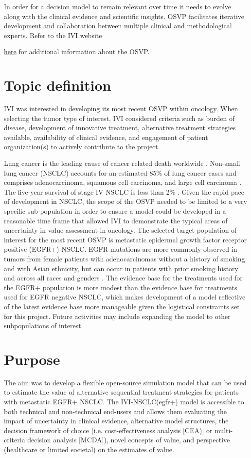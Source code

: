 \documentclass[11pt,final,fleqn]{article}\usepackage[]{graphicx}\usepackage[]{color}
\theoremstyle{plain}
\begin{document}
In order for a decision model to remain relevant over time it needs to evolve along with the clinical evidence and scientific insights. OSVP facilitates iterative development and collaboration between multiple clinical and methodological experts.
Refer to the IVI website {\href{https://www.thevalueinitiative.org/open-source-value-project/}{here} for additional information about the OSVP. 


\section{Topic definition}\label{sec:topic}
IVI was interested in developing its most recent OSVP within oncology. When selecting the tumor type of interest, IVI considered criteria such as burden of disease, development of innovative treatment, alternative treatment strategies available, availability of clinical evidence, and engagement of patient organization(s) to actively contribute to the project. 

Lung cancer is the leading cause of cancer related death worldwide \citep{jemal2011global}. Non-small lung cancer (NSCLC) accounts for an estimated 85\% of lung cancer cases and comprises adenocarcinoma, squamous cell carcinoma, and large cell carcinoma \citep{d2010metastatic}. The five-year survival of stage IV NSCLC is less than 2\% \citep{cetin2011survival}. Given the rapid pace of development in NSCLC, the scope of the OSVP needed to be limited to a very specific sub-population in order to ensure a model could be developed in a reasonable time frame that allowed IVI to demonstrate the typical areas of uncertainty in value assessment in oncology. The selected target population of interest for the most recent OSVP is metastatic epidermal growth factor receptor positive (EGFR+) NSCLC. EGFR mutations are more commonly observed in tumors from female patients with adenocarcinomas without a history of smoking and with Asian ethnicity, but can occur in patients with prior smoking history and across all races and genders \citep{lynch2004activating}. The evidence base for the treatments used for the EGFR+ population is more modest than the evidence base for treatments used for EGFR negative NSCLC, which makes development of a model reflective of the latest evidence base more manageable given the logistical constraints set for this project. Future activities may include expanding the model to other subpopulations of interest.


\section{Purpose}\label{sec:purpose}
The aim was to develop a flexible open-source simulation model that can be used to estimate the value of alternative sequential treatment strategies for patients with metastatic EGFR+ NSCLC. The IVI-NSCLC(egfr+) model is accessible to both technical and non-technical end-users and allows them evaluating the impact of uncertainty in clinical evidence, alternative model structures, the decision framework of choice (i.e. cost-effectiveness analysis [CEA)] or multi-criteria decision analysis [MCDA]), novel concepts of value, and perspective (healthcare or limited societal) on the estimates of value.

}
\end{document}
